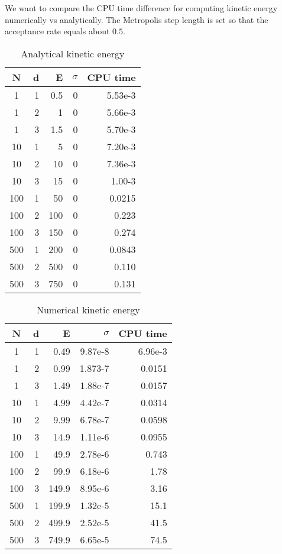 \documentclass[english, a4paper]{article}
\begin{document}
We want to compare the CPU time difference for computing kinetic energy numerically vs analytically. 
The Metropolis step length is set so that the acceptance rate equals about $0.5$.

\begin{table}[H]
  \centering
  \begin{tabular}{ | c | r | r | r | r |}
    \hline
    N& d& E& $\sigma$& CPU time \\*
    \hline
    1& 1& 0.5& 0& 5.53e-3 \\*
    \hline
    1& 2& 1& 0&  5.66e-3\\*
    \hline
    1& 3& 1.5& 0&  5.70e-3\\*
    \hline
    10& 1& 5& 0&  7.20e-3\\*
    \hline
    10& 2& 10& 0&  7.36e-3\\*
    \hline
    10& 3& 15& 0&  1.00-3\\*
    \hline
    100& 1& 50& 0&  0.0215\\*
    \hline
    100& 2& 100& 0&  0.223\\*
    \hline
    100& 3& 150& 0&  0.274\\*
    \hline
    500& 1& 200& 0&  0.0843\\*
    \hline
    500& 2& 500& 0&  0.110\\*
    \hline
    500& 3& 750& 0&  0.131\\*
    \hline
  \end{tabular}
  \caption{Analytical kinetic energy}
  \label{tab:Tabell1}
\end{table}

\begin{table}[H]
  \centering
  \begin{tabular}{ | c | r | r | r | r |}
    \hline
    N& d& E& $\sigma$& CPU time \\*
    \hline
    1& 1& 0.49& 9.87e-8& 6.96e-3 \\*
    \hline
    1& 2& 0.99& 1.873-7&  0.0151\\*
    \hline
    1& 3& 1.49& 1.88e-7&  0.0157\\*
    \hline
    10& 1& 4.99& 4.42e-7&  0.0314\\*
    \hline
    10& 2& 9.99& 6.78e-7&  0.0598\\*
    \hline
    10& 3& 14.9& 1.11e-6&  0.0955\\*
    \hline
    100& 1& 49.9& 2.78e-6&  0.743\\*
    \hline
    100& 2& 99.9& 6.18e-6&  1.78\\*
    \hline
    100& 3& 149.9& 8.95e-6&  3.16\\*
    \hline
    500& 1& 199.9& 1.32e-5&  15.1\\*
    \hline
    500& 2& 499.9& 2.52e-5&  41.5\\*
    \hline
    500& 3& 749.9& 6.65e-5&  74.5\\*
    \hline
  \end{tabular}
  \caption{Numerical kinetic energy}
  \label{tab:Tabell1}
\end{table}
\end{document}
